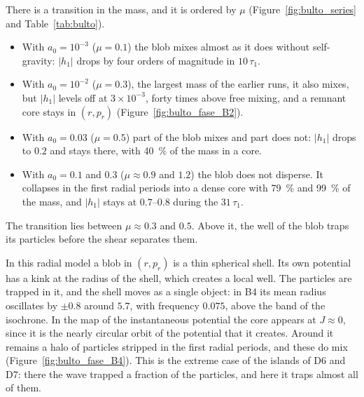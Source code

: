 \documentclass[11pt,a4paper]{article}
\begin{document}
There is a transition in the mass, and it is ordered by $\mu$ (Figure~\ref{fig:bulto_series}
and Table~\ref{tab:bulto}).
\begin{itemize}
\item With $a_0=10^{-3}$ ($\mu=0.1$) the blob mixes almost as it does without self-gravity:
$|h_1|$ drops by four orders of magnitude in $10\,\tau_1$.
\item With $a_0=10^{-2}$ ($\mu=0.3$), the largest mass of the earlier runs, it also mixes,
but $|h_1|$ levels off at $3\times10^{-3}$, forty times above free mixing, and a remnant core
stays in $(r,p_r)$ (Figure~\ref{fig:bulto_fase_B2}).
\item With $a_0=0.03$ ($\mu=0.5$) part of the blob mixes and part does not: $|h_1|$ drops to
$0.2$ and stays there, with \SI{40}{\%} of the mass in a core.
\item With $a_0=0.1$ and $0.3$ ($\mu\approx0.9$ and $1.2$) the blob does not disperse. It
collapses in the first radial periods into a dense core with \SI{79}{\%} and \SI{99}{\%} of
the mass, and $|h_1|$ stays at $0.7$--$0.8$ during the $31\,\tau_1$.
\end{itemize}
The transition lies between $\mu\approx0.3$ and $0.5$. Above it, the well of the blob traps
its particles before the shear separates them.

In this radial model a blob in $(r,p_r)$ is a thin spherical shell. Its own potential has
a kink at the radius of the shell, which creates a local well. The particles are trapped
in it, and the shell moves as a single object: in B4 its mean radius oscillates by
$\pm0.8$ around $5.7$, with frequency $0.075$, above the band of the isochrone. In the map
of the instantaneous potential the core appears at $J\approx0$, since it is the nearly
circular orbit of the potential that it creates. Around it remains a halo of particles
stripped in the first radial periods, and these do mix (Figure~\ref{fig:bulto_fase_B4}).
This is the extreme case of the islands of D6 and D7: there the wave trapped a fraction
of the particles, and here it traps almost all of them.
\end{document}
